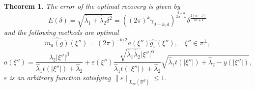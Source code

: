 \documentclass[12pt]{iopart}
\newtheorem{theorem}{Theorem}
\begin{document}
\begin{theorem}
\label{theorem}
The error of the optimal recovery is given by
  \[
E(\delta)=\sqrt{\widehat\lambda_1+\widehat\lambda_2\delta^2}=((2\pi)^k\gamma_{d-k,d})^{\frac{\beta-\alpha}{2\alpha+k}}\delta^{\frac{2(\alpha-\beta)}{2\alpha+k}}
\]
and the following methods are optimal
 \begin{equation}
\label{method}
  \widehat{m_a(g)}(\xi'')=(2\pi)^{-k/2}a(\xi'')\widehat{g_\pi }(\xi''),\quad \xi''\in\pi^\perp,
\end{equation}
  \begin{equation}
  \label{a}
  a(\xi'')=\frac{\widehat\lambda_2|\xi''|^\beta}{\widehat\lambda_1t(|\xi''|)+\widehat\lambda_2}+\varepsilon(\xi'')\frac{\sqrt{\widehat\lambda_1\widehat\lambda_2}|\xi''|^\alpha}{\widehat\lambda_1t(|\xi''|)+\widehat\lambda_2}\sqrt{\widehat\lambda_1t(|\xi''|)+\widehat\lambda_2-y(|\xi''|)},
  \end{equation}
  $\varepsilon$ is an arbitrary function satisfying $\|\varepsilon\|_{L_\infty(\mathbb R^d)}\le 1$.
\end{theorem}
\end{document}
